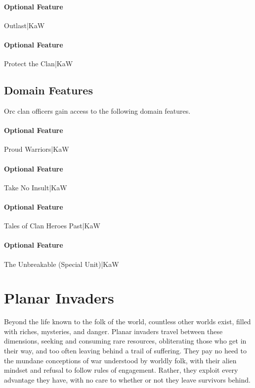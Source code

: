 \documentclass[10pt,a4paper,twoside,bg=print,twocolumn,openany,nodeprecatedcode]{dndbook}
\begin{document}
\paragraph{Optional Feature}
Outlast|KaW

\paragraph{Optional Feature}
Protect the Clan|KaW

\subsection{Domain Features}
Orc clan officers gain access to the following domain features.

\paragraph{Optional Feature}
Proud Warriors|KaW

\paragraph{Optional Feature}
Take No Insult|KaW

\paragraph{Optional Feature}
Tales of Clan Heroes Past|KaW

\paragraph{Optional Feature}
The Unbreakable (Special Unit)|KaW

\section{Planar Invaders}
Beyond the life known to the folk of the world, countless other worlds exist, filled with riches, mysteries, and danger. Planar invaders travel between these dimensions, seeking and consuming rare resources, obliterating those who get in their way, and too often leaving behind a trail of suffering. They pay no heed to the mundane conceptions of war understood by worldly folk, with their alien mindset and refusal to follow rules of engagement. Rather, they exploit every advantage they have, with no care to whether or not they leave survivors behind.
\end{document}
